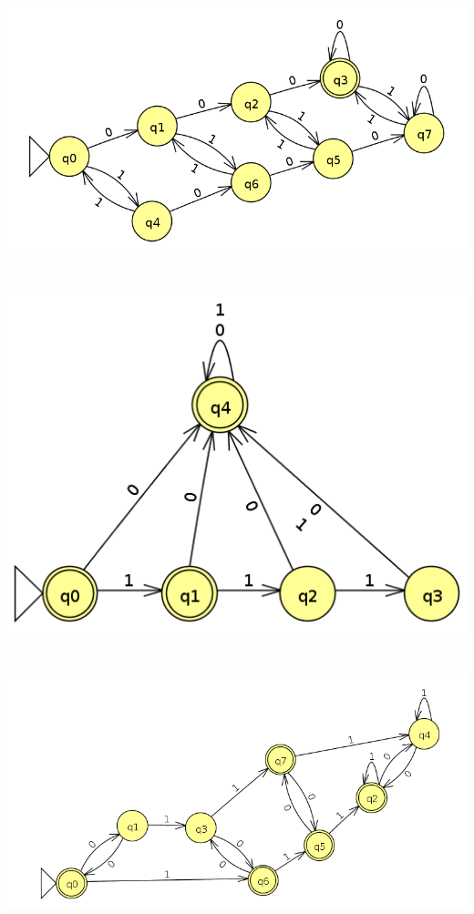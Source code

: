 \documentclass[a4paper,12pt]{article}
\begin{document}
\section{}
\includegraphics[width=15cm]{question3}
\section{}
\includegraphics[width=15cm]{question4}
\section{}
\includegraphics[width=15cm]{question5}
\end{document}
